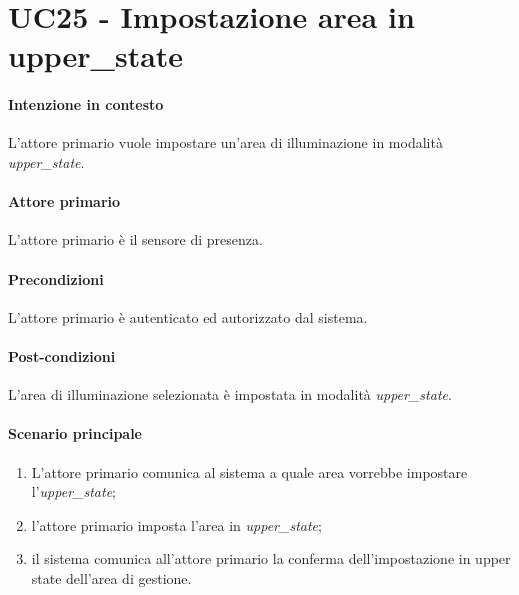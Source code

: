 \section{UC25 - Impostazione area in upper\_state}\label{uc:25}
\paragraph{Intenzione in contesto} L'attore primario vuole impostare un'area di illuminazione in modalità \textit{upper\_state}.
\paragraph{Attore primario} L'attore primario è il sensore di presenza.
\paragraph{Precondizioni} L'attore primario è autenticato ed autorizzato dal sistema.
\paragraph{Post-condizioni} L'area di illuminazione selezionata è impostata in modalità \textit{upper\_state}.
\paragraph{Scenario principale}
\begin{enumerate}
    \item L'attore primario comunica al sistema a quale area vorrebbe impostare l'\textit{upper\_state};
    \item l'attore primario imposta l'area in \textit{upper\_state};
    \item il sistema comunica all'attore primario la conferma dell'impostazione in upper state dell'area di gestione.
\end{enumerate}